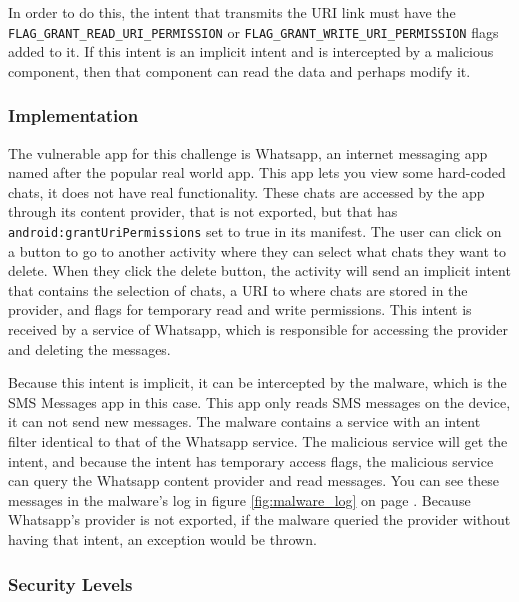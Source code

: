     In order to do this, the intent that transmits the URI link must have the \lstinline|FLAG_GRANT_READ_URI_PERMISSION| or \lstinline|FLAG_GRANT_WRITE_URI_PERMISSION| flags added to it. If this intent is an implicit intent and is intercepted by a malicious component, then that component can read the data and perhaps modify it.
    
    \subsubsection{Implementation}
        \label{subsubsec:provider_uri_hijack_implementation}
        
    The vulnerable app for this challenge is Whatsapp, an internet messaging app named after the popular real world app. This app lets you view some hard-coded chats, it does not have real functionality. These chats are accessed by the app through its content provider, that is not exported, but that has \lstinline|android:grantUriPermissions| set to true in its manifest. The user can click on a button to go to another activity where they can select what chats they want to delete. When they click the delete button, the activity will send an implicit intent that contains the selection of chats, a URI to where chats are stored in the provider, and flags for temporary read and write permissions. This intent is received by a service of Whatsapp, which is responsible for accessing the provider and deleting the messages.
    
    Because this intent is implicit, it can be intercepted by the malware, which is the SMS Messages app in this case. This app only reads SMS messages on the device, it can not send new messages. The malware contains a service with an intent filter identical to that of the Whatsapp service. The malicious service will get the intent, and because the intent has temporary access flags, the malicious service can query the Whatsapp content provider and read messages. You can see these messages in the malware's log in figure \ref{fig:malware_log} on page \pageref{fig:malware_log}. Because Whatsapp's provider is not exported, if the malware queried the provider without having that intent, an exception would be thrown.
    
    \subsubsection{Security Levels}
        \label{subsubsec:provider_uri_hijack_security_levels}
        
